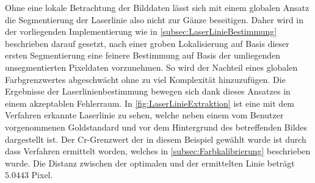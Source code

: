 \bigbreak
Ohne eine lokale Betrachtung der Bilddaten lässt sich mit einem globalen Ansatz die Segmentierung der Laserlinie also nicht zur  Gänze beseitigen. Daher wird in der vorliegenden Implementierung wie in \ref{subsec:LaserLinieBestimmung} beschrieben darauf gesetzt, nach einer groben Lokalisierung auf Basis dieser ersten Segmentierung eine feinere Bestimmung auf Basis der umliegenden unsegmentierten Pixeldaten vorzunehmen. So wird der Nachteil eines globalen Farbgrenzwertes abgeschwächt ohne zu viel Komplexität hinzuzufügen. Die Ergebnisse der Laserlinienbestimmung bewegen sich dank dieses Ansatzes in einem akzeptablen Fehlerraum. In \ref{fig:LaserLinieExtraktion} ist eine mit dem Verfahren erkannte Laserlinie zu sehen, welche neben einem vom Benutzer vorgenommenen Goldstandard und vor dem Hintergrund des betreffenden Bildes dargestellt ist. Der Cr-Grenzwert der in diesem Beispiel gewählt wurde ist durch dass Verfahren ermittelt worden, welches in \ref{subsec:Farbkalibrierung} beschrieben wurde. Die Distanz zwischen der optimalen und der ermittelten Linie beträgt \(5.0443\) Pixel.

